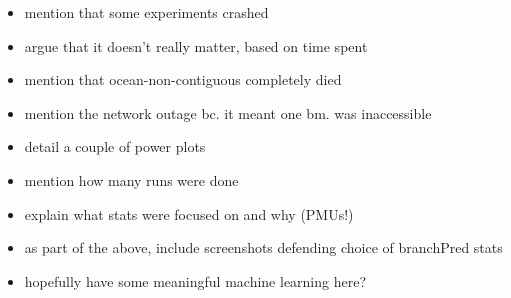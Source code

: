 \begin{itemize}
    \item mention that some experiments crashed
    \item argue that it doesn't really matter, based on time spent
    \item mention that ocean-non-contiguous completely died
    \item mention the network outage bc. it meant one bm. was inaccessible
    \item detail a couple of power plots
    \item mention how many runs were done
    \item explain what stats were focused on and why (PMUs!)
    \item as part of the above, include screenshots defending choice of 
          branchPred stats
    \item hopefully have some meaningful machine learning here?
\end{itemize}